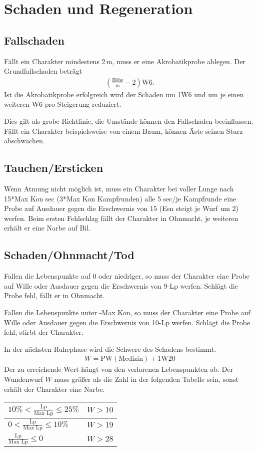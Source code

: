 \documentclass[../../Heldenanleitung2]{subfiles}
\begin{document}
\section{Schaden und Regeneration}

\subsection{Fallschaden}
Fällt ein Charakter mindestens 2\,m, muss er eine Akrobatikprobe ablegen. Der Grundfallschaden beträgt
\begin{align*}
	\left(\frac{\text{Höhe}}{\text{m}}-2\right)\text{W}6.
\end{align*}
Ist die Akrobatikprobe erfolgreich wird der Schaden um 1W6 und um je einen weiteren W6 pro Steigerung reduziert.

Dies gilt als grobe Richtlinie, die Umstände können den Fallschaden beeinflussen. Fällt ein Charakter beispielsweise von einem Baum, können Äste seinen Sturz abschwächen.

\subsection{Tauchen/Ersticken}
Wenn Atmung nicht möglich ist, muss ein Charakter bei voller Lunge nach 15*Max Kon sec (3*Max Kon Kampfrunden) alle 5 sec/je Kampfrunde eine Probe auf Ausdauer gegen die Erschwernis von 15 (Esn steigt je Wurf um 2) werfen. Beim ersten Fehlschlag fällt der Charakter in Ohnmacht, je weiteren erhält er eine Narbe auf Bil.

\subsection{Schaden/Ohnmacht/Tod}
Fallen die Lebenspunkte auf 0 oder niedriger, so muss der Charakter eine Probe auf Wille oder Ausdauer gegen die Erschwernis von 9-Lp werfen. Schlägt die Probe fehl, fällt er in Ohnmacht.

Fallen die Lebenspunkte unter -Max Kon, so muss der Charakter eine Probe auf Wille oder Ausdauer gegen die Erschwernis von 10-Lp werfen. Schlägt die Probe fehl, stirbt der Charakter.

In der nächsten Ruhephase wird die Schwere des Schadens bestimmt.
\begin{align*}
 W = \text{PW}\left(\text{Medizin}\right) + 1\text{W}20
\end{align*}
Der zu erreichende Wert hängt von den verlorenen Lebenspunkten ab. Der Wundenwurf $W$ muss größer als die Zahl in der folgenden Tabelle sein, sonst erhält der Charakter eine Narbe.
\begin{center}
\begin{tabular}{|l|l|}
\hline
$10 \% < \frac{\text{Lp}}{\text{Max Lp}} \le 25 \%$ & $W > 10$ \\ \hline
$0 < \frac{\text{Lp}}{\text{Max Lp}} \le 10 \%$ & $W > 19$\\ \hline
$\frac{\text{Lp}}{\text{Max Lp}} \le 0$ & $W > 28$\\ \hline
\end{tabular}
\end{center}
\end{document}

